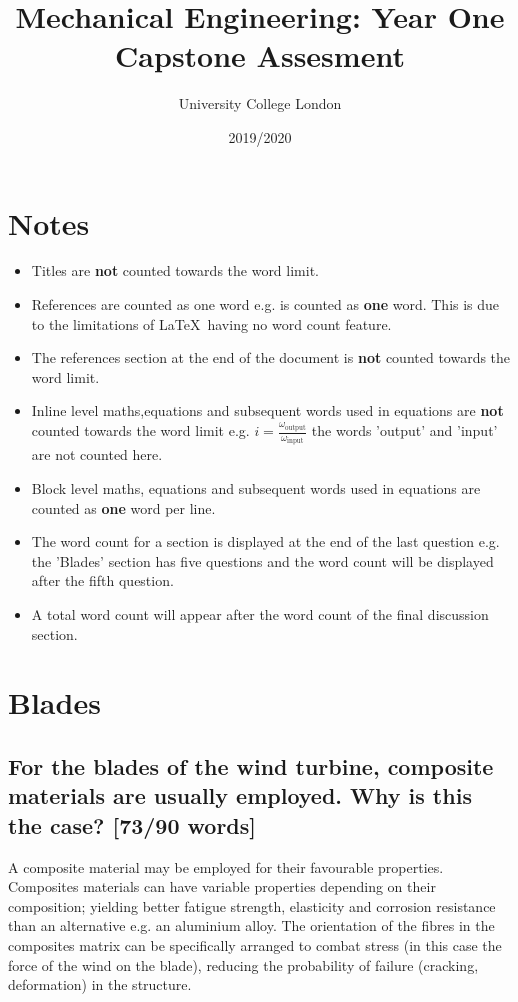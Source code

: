 \documentclass[12pt]{article}
\newcommand{\citeprimsec}[2]{\citep[][cited by \citealp{#2}]{#1}}
\numberwithin{equation}{section}
\begin{document}
\title{Mechanical Engineering: Year One Capstone Assesment}
\date{2019/2020}
\author{University College London}
\maketitle
\begin{flushleft}
\tableofcontents

\section*{Notes}
\begin{itemize}
  \item Titles are \textbf{not} counted towards the word limit.
  \item References are counted as one word e.g. \citeprimsec{windTurbineMaterial2}{windTurbineMaterial} is counted as \textbf{one} word. This is due to the limitations of \LaTeX \ having no word count feature.
  \item The references section at the end of the document is \textbf{not} counted towards the word limit.
  \item Inline level maths,equations and subsequent words used in equations are \textbf{not} counted towards the word limit e.g. $i = \frac{\omega_{\textrm{output}}}{\omega_{\textrm{input}}}$ the words 'output' and 'input' are not counted here.
  \item Block level maths, equations and subsequent words used in equations are counted as \textbf{one} word per line.
  \item The word count for a section is displayed at the end of the last question e.g. the 'Blades' section has five questions and the word count will be displayed after the fifth question.
  \item A total word count will appear after the word count of the final discussion section.
\end{itemize}
\newpage

\section{Blades}
\subsection[Why use composites?]{For the blades of the wind turbine, composite materials are usually employed. Why is this the case? [73/90 words]}
A composite material may be employed for their favourable properties. Composites materials can have variable properties depending on their composition; yielding better fatigue strength, elasticity and corrosion resistance than an alternative e.g. an aluminium alloy. The orientation of the fibres in the composites matrix can be specifically arranged to combat stress (in this case the force of the wind on the blade), reducing the probability of failure (cracking, deformation) in the structure.


\end{flushleft}
\end{document}
